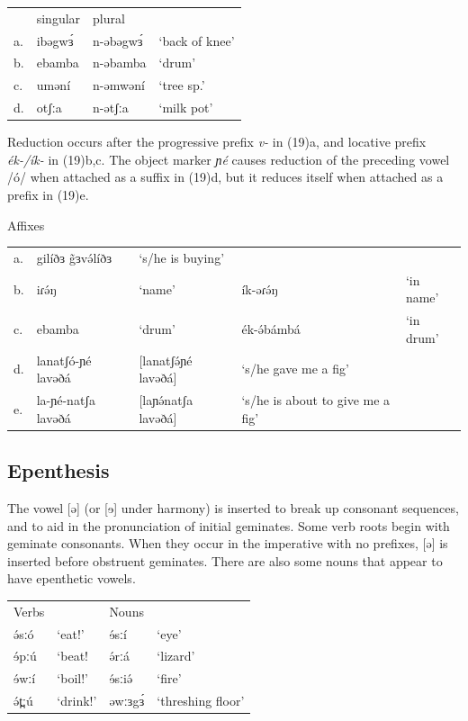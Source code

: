\ea
\begin{tabular}[t]{llll}
&	singular&	plural\\
a.&	ibəgwɜ́	&	n-əbəgwɜ́	&	‘back of knee’\\
b.&	ebamba 	&	n-əbamba		&	‘drum’\\
c.&	uməní 	&	n-əmwəní 	&	‘tree sp.’\\
d.&	otʃːa 	&	n-ətʃːa 	&	‘milk pot’\\
\end{tabular}
\z

Reduction occurs after the progressive prefix \textit{v-} in (19)a, and locative prefix \textit{ék-/ík-} in (19)b,c. The object marker \textit{ɲé} causes reduction of the preceding vowel /ó/ when attached as a suffix in (19)d, but it reduces itself when attached as a prefix in (19)e.

\ea Affixes
\begin{tabular}[t]{lllll}
  	a.& gilíðɜ \~ gɜvə́líðɜ	&	‘s/he is buying’\\
	b.&	iɾə́ŋ 				&	‘name’	&	ík-əɾə́ŋ		&	‘in name’\\
	c.&	ebamba				&	‘drum’	&	ék-ə́bámbá		&	‘in drum’\\
	d.&	lanatʃó-ɲé lavəðá  	&[lanatʃə́ɲé lavəðá]	&	‘s/he gave me a fig’\\
	e.& la-ɲé-natʃa lavəðá	&[laɲə́natʃa lavəðá]	&	‘s/he is about to give me a fig’\\
\end{tabular}
\z

\subsection{Epenthesis}\label{epenthesis}
The vowel [ə] (or [ɘ] under harmony) is inserted to break up consonant sequences, and to aid in the pronunciation of initial geminates. Some verb roots begin with geminate consonants. When they occur in the imperative with no prefixes, [ə] is inserted before obstruent geminates. There are also some nouns that appear to have epenthetic vowels.

\ea
\begin{tabular}[t]{llll}
Verbs	&	&	Nouns\\
ə́sːó	&	‘eat!’	&	ɘ́sːí	&	‘eye’\\
ɘ́pːú	&	‘beat!	&	ə́rːá	&	‘lizard’\\
ɘ́wːí	&	‘boil!’	&	ɘ́sːiə́	&	‘fire’\\
ə́t̪ːú	&	‘drink!’	&	əwːɜgɜ́	&	‘threshing floor’\\
\end{tabular}
\z

